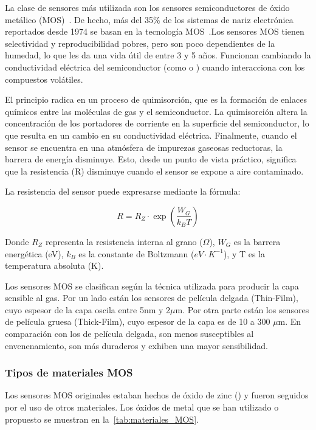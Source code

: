 La clase de sensores más utilizada son los sensores semiconductores de óxido metálico (MOS)~\cite{YamazoeShimanoe2008}. De hecho, más del 35\% de los sistemas de nariz electrónica reportados desde 1974 se basan en la tecnología MOS~\cite{KhorramifariKaramiLvova2023}.\@ Los sensores MOS tienen selectividad y reproducibilidad pobres, pero son poco dependientes de la humedad, lo que les da una vida útil de entre 3 y 5 años. Funcionan cambiando la conductividad eléctrica del semiconductor (como  o ) cuando interacciona con los compuestos volátiles. 
\par

El principio radica en un proceso de quimisorción, que es la formación de enlaces químicos entre las moléculas de gas y el semiconductor. La quimisorción altera la concentración de los portadores de corriente en la superficie del semiconductor, lo que resulta en un cambio en su conductividad eléctrica. Finalmente, cuando el sensor se encuentra en una atmósfera de impurezas gaseosas reductoras, la barrera de energía disminuye. Esto, desde un punto de vista práctico, significa que la resistencia (R) disminuye cuando el sensor se expone a aire contaminado.
\par

La resistencia del sensor puede expresarse mediante la fórmula:

\begin{equation}
    R = R_Z \cdot \exp\left(\frac{W_G}{k_B T}\right)
    \label{eq:resistencia_sensor}
\end{equation}

Donde $R_Z$ representa la resistencia interna al grano ($\Omega$), $W_G$ es la barrera energética (eV), $k_B$ es la constante de Boltzmann ($eV \cdot K^{-1}$), y T es la temperatura absoluta (K).
\par

Los sensores MOS se clasifican según la técnica utilizada para producir la capa sensible al gas. Por un lado están los sensores de película delgada (Thin-Film), cuyo espesor de la capa oscila entre 5nm y 2$\mu$m. Por otra parte están los sensores de película gruesa (Thick-Film), cuyo espesor de la capa es de 10 a 300 $\mu$m. En comparación con los de película delgada, son menos susceptibles al envenenamiento, son más duraderos y exhiben una mayor sensibilidad.

\subsubsection{Tipos de materiales MOS}
Los sensores MOS originales estaban hechos de óxido de zinc () y fueron seguidos por el uso de otros materiales. Los óxidos de metal que se han utilizado o propuesto se muestran en la~\autoref{tab:materiales_MOS}.

